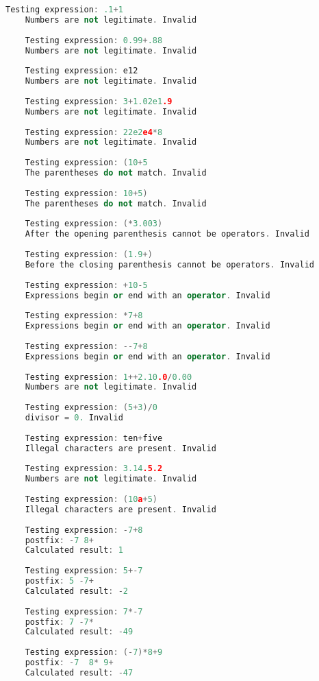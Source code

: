 \documentclass[UTF8]{ctexart}
\begin{document}
\begin{lstlisting}[language=c++, breaklines=true, frame=shadowbox, rulesepcolor=\color{red!20!green!20!blue!20}]
    Testing expression: .1+1
    Numbers are not legitimate. Invalid
    
    Testing expression: 0.99+.88
    Numbers are not legitimate. Invalid
    
    Testing expression: e12
    Numbers are not legitimate. Invalid
    
    Testing expression: 3+1.02e1.9
    Numbers are not legitimate. Invalid
    
    Testing expression: 22e2e4*8
    Numbers are not legitimate. Invalid
    
    Testing expression: (10+5
    The parentheses do not match. Invalid
    
    Testing expression: 10+5)
    The parentheses do not match. Invalid
    
    Testing expression: (*3.003)
    After the opening parenthesis cannot be operators. Invalid
    
    Testing expression: (1.9+)
    Before the closing parenthesis cannot be operators. Invalid
    
    Testing expression: +10-5
    Expressions begin or end with an operator. Invalid
    
    Testing expression: *7+8
    Expressions begin or end with an operator. Invalid
    
    Testing expression: --7+8
    Expressions begin or end with an operator. Invalid
    
    Testing expression: 1++2.10.0/0.00
    Numbers are not legitimate. Invalid
    
    Testing expression: (5+3)/0
    divisor = 0. Invalid
    
    Testing expression: ten+five
    Illegal characters are present. Invalid
    
    Testing expression: 3.14.5.2
    Numbers are not legitimate. Invalid
    
    Testing expression: (10a+5)
    Illegal characters are present. Invalid
    
    Testing expression: -7+8
    postfix: -7 8+
    Calculated result: 1
    
    Testing expression: 5+-7
    postfix: 5 -7+
    Calculated result: -2
    
    Testing expression: 7*-7
    postfix: 7 -7*
    Calculated result: -49
    
    Testing expression: (-7)*8+9
    postfix: -7  8* 9+
    Calculated result: -47
    

\end{lstlisting}
\end{document}
